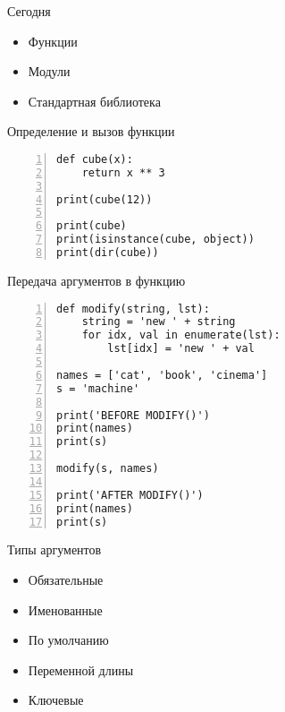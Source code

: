 \documentclass[hyperref={pdftex,unicode}]{beamer}
\begin{document}
\begin{frame}
  \maketitle
\end{frame}

\begin{frame}{Сегодня}
  \begin{itemize}
    \item Функции
    \item Модули
    \item Стандартная библиотека
  \end{itemize}
\end{frame}

\begin{frame}[fragile]{Определение и вызов функции}
    \begin{lstlisting}[numbers=left]
def cube(x):
    return x ** 3

print(cube(12))

print(cube)
print(isinstance(cube, object))
print(dir(cube))
    \end{lstlisting}
\end{frame}

\begin{frame}[fragile]{Передача аргументов в функцию}
      \begin{lstlisting}[numbers=left]
def modify(string, lst):
    string = 'new ' + string
    for idx, val in enumerate(lst):
        lst[idx] = 'new ' + val

names = ['cat', 'book', 'cinema']
s = 'machine'

print('BEFORE MODIFY()')
print(names)
print(s)

modify(s, names)

print('AFTER MODIFY()')
print(names)
print(s)
    \end{lstlisting}
\end{frame}

\begin{frame}{Типы аргументов}
  \begin{itemize}
  \item Обязательные
  \item Именованные
  \item По умолчанию
  \item Переменной длины
  \item Ключевые
  \end{itemize}
\end{frame}
\end{document}
